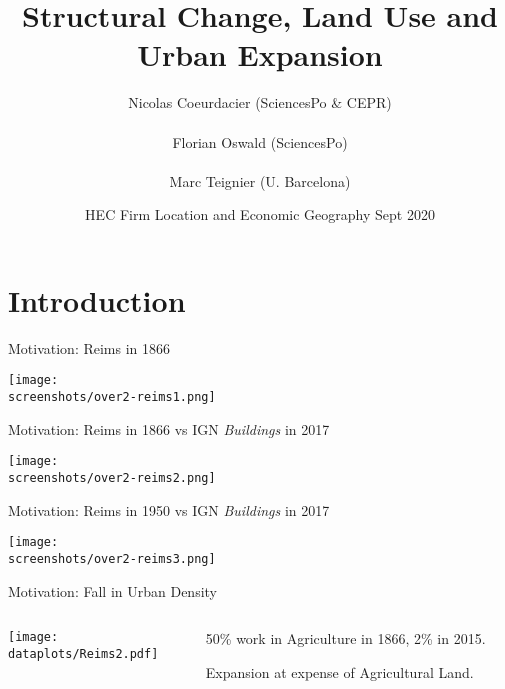 \documentclass[aspectratio=169]{beamer}
\begin{document}
\title{\textbf{Structural Change, Land Use and Urban Expansion}}
\author{Nicolas Coeurdacier (SciencesPo \& CEPR)\\ \ \\Florian Oswald (SciencesPo) \\ \ \\ Marc Teignier (U. Barcelona)}
\date{HEC Firm Location and Economic Geography Sept 2020}


\frame{\titlepage}



\section{Introduction}

\begin{frame}{Motivation: Reims in 1866}
\begin{adjustbox}{center}
\texttt{[image: \\screenshots/over2-reims1.png]}\end{adjustbox}
\end{frame}

\begin{frame}{Motivation: Reims in 1866 vs IGN \emph{Buildings} in 2017}
\begin{adjustbox}{center}
\texttt{[image: \\screenshots/over2-reims2.png]}\end{adjustbox}
\end{frame}

\begin{frame}{Motivation: Reims in 1950 vs IGN \emph{Buildings} in 2017}
\begin{adjustbox}{center}
\texttt{[image: \\screenshots/over2-reims3.png]}\end{adjustbox}
\end{frame}

\begin{frame}{Motivation: Fall in Urban Density}
\begin{columns}
\begin{column}{0.7\textwidth}
\texttt{[image: \\dataplots/Reims2.pdf]}
\end{column}
\begin{column}{0.3\textwidth}
\begin{midi}
\item 50\% work in Agriculture in 1866, 2\% in 2015.
\item Expansion at expense of Agricultural Land.
\end{midi}

\end{column}
\end{columns}
\end{frame}
\end{document}
